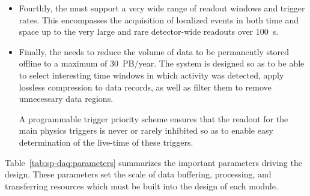 \begin{itemize}
\item Fourthly, the  must support a very wide range of readout windows and trigger rates. This encompasses the acquisition of localized events in both time and space up to the very large and rare  detector-wide readouts over \SI{100}{s}.

\item Finally, the  needs to reduce the volume of data to be permanently stored offline to a maximum of \SI{30}{PB/year}.
  The  system is designed so as to be able to select interesting time windows in which activity was detected, apply lossless compression to data records, as well as filter them to remove unnecessary data regions.

A programmable trigger priority scheme ensures that the readout for the main physics triggers is never or rarely inhibited so as to enable easy determination of the live-time of these triggers. 


\end{itemize}

Table~\ref{tab:sp-daq:parameters} summarizes the important parameters driving the  design. These parameters set the scale of data buffering, processing, and transferring resources which must be built into the design of each  module. 

